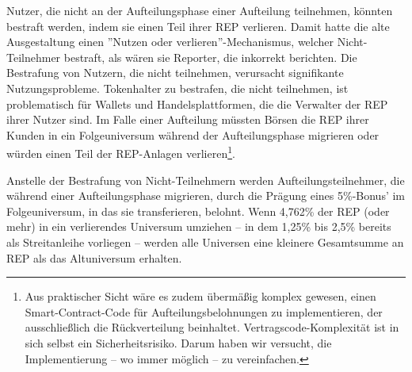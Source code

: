 \documentclass[floatfix,reprint,nofootinbib,amsmath,amssymb,epsfig,pre,floats,letterpaper,groupedaffiliation]{revtex4-1}
\theoremstyle{definition}
\theoremstyle{definition}
\theoremstyle{definition}
\begin{document}
\begin{appendix}
Nutzer, die nicht an der Aufteilungsphase einer Aufteilung teilnehmen, könnten bestraft werden, indem sie einen Teil ihrer REP verlieren. Damit hatte die alte Ausgestaltung einen ''Nutzen oder verlieren''-Mechanismus, welcher Nicht-Teilnehmer bestraft, als wären sie Reporter, die inkorrekt berichten. Die Bestrafung von Nutzern, die nicht teilnehmen, verursacht signifikante Nutzungsprobleme. Tokenhalter zu bestrafen, die nicht teilnehmen, ist problematisch für Wallets und Handelsplattformen, die die Verwalter der REP ihrer Nutzer sind. Im Falle einer Aufteilung müssten Börsen die REP ihrer Kunden in ein Folgeuniversum während der Aufteilungsphase migrieren oder würden einen Teil der REP-Anlagen verlieren\footnote{Aus praktischer Sicht wäre es zudem übermäßig komplex gewesen, einen Smart-Contract-Code für Aufteilungsbelohnungen zu implementieren, der ausschließlich die Rückverteilung beinhaltet. Vertragscode-Komplexität ist in sich selbst ein Sicherheitsrisiko. Darum haben wir versucht, die Implementierung – wo immer möglich – zu vereinfachen.}.

Anstelle der Bestrafung von Nicht-Teilnehmern werden Aufteilungsteilnehmer, die während einer Aufteilungsphase migrieren, durch die Prägung eines 5\%-Bonus' im Folgeuniversum, in das sie transferieren, belohnt. Wenn 4,762\% der REP (oder mehr) in ein verlierendes Universum umziehen – in dem 1,25\% bis 2,5\% bereits als Streitanleihe vorliegen – werden alle Universen eine kleinere Gesamtsumme an REP als das Altuniversum erhalten.

\end{appendix}
\end{document}
